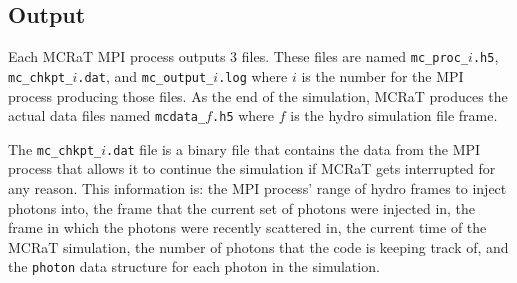 \documentclass[12pt,a4paper]{article}
\begin{document}
\subsection{Output} 

Each MCRaT MPI process outputs 3 files. These files are named \texttt{mc\_proc\_$i$.h5}, \texttt{mc\_chkpt\_$i$.dat}, and \texttt{mc\_output\_$i$.log} where $i$ is the number for the MPI process producing those files. As the end of the simulation, MCRaT produces the actual data files named \texttt{mcdata\_$f$.h5} where $f$ is the hydro simulation file frame.

The \texttt{mc\_chkpt\_$i$.dat} file is a binary file that contains the data from the MPI process that allows it to continue the simulation if MCRaT gets interrupted for any reason. This information is: the MPI process' range of hydro frames to inject photons into, the frame that the current set of photons were injected in, the frame in which the photons were recently scattered in, the current time of the MCRaT simulation, the number of photons that the code is keeping track of, and the \texttt{photon} data structure for each photon in the simulation.
\end{document}
